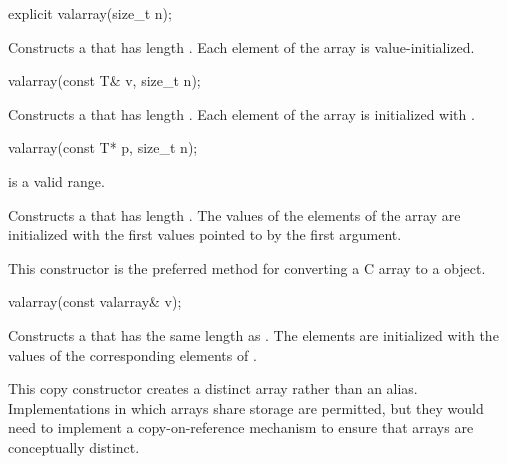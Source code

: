 %
\begin{itemdecl}
explicit valarray(size_t n);
\end{itemdecl}

\begin{itemdescr}
\pnum
\effects
Constructs a  that has length .
Each element of the array is value-initialized.
\end{itemdescr}

%
\begin{itemdecl}
valarray(const T& v, size_t n);
\end{itemdecl}

\begin{itemdescr}
\pnum
\effects
Constructs a  that has length .
Each element of the array is initialized with .
\end{itemdescr}

%
\begin{itemdecl}
valarray(const T* p, size_t n);
\end{itemdecl}

\begin{itemdescr}

\pnum
\expects
{} is a valid range.

\pnum
\effects
Constructs a  that has length .
The values of the elements of the array are initialized with the
first
values pointed to by the first argument.
\begin{footnote}
This constructor is the
preferred method for converting a C array to a
object.
\end{footnote}
\end{itemdescr}

%
\begin{itemdecl}
valarray(const valarray& v);
\end{itemdecl}

\begin{itemdescr}
\pnum
\effects
Constructs a  that has the same length as .
The elements are initialized with the values of the corresponding
elements of .
\begin{footnote}
This copy constructor creates
a distinct array rather than an alias.
Implementations in which arrays share storage are permitted, but they
would need to implement a copy-on-reference mechanism to ensure that arrays are
conceptually distinct.
\end{footnote}
\end{itemdescr}


